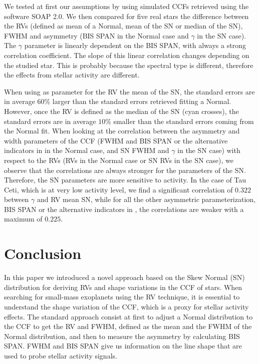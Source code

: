 \documentclass[11pt, oneside]{article}
\def\kms{\hbox{\,km\,s$^{-1}$}}       %
\begin{document}
{We tested at first our assumptions by using simulated CCFs retrieved using the software SOAP 2.0. We then compared for five real stars the difference between the RVs (defined as mean of a Normal, mean of the SN or median of the SN), FWHM and asymmetry (BIS SPAN in the Normal case and $\gamma$ in the SN case). The $\gamma$ parameter is linearly dependent on the BIS SPAN, with always a strong correlation coefficient. 
The slope of this linear correlation changes depending on the studied star. This is probably because the spectral type is different, therefore the effects from stellar activity are different.

When using as parameter for the RV the mean of the SN, the standard errors are in average $60\%$ larger than the standard errors retrieved fitting a Normal. However, once the RV is defined as the median of the SN (cyan crosses), the standard errors are in average $10\%$ smaller than the standard errors coming from the Normal fit. When looking at the correlation between the asymmetry and width parameters of the CCF (FWHM and BIS SPAN or the alternative indicators in \citet{Figueira-2013} in the Normal case, and SN FWHM and $\gamma$ in the SN case) with respect to the RVs (RVs in the Normal case or SN RVs in the SN case), we observe that the correlations are always stronger for the parameters of the SN. Therefore, the SN parameters are more sensitive to activity. In the case of Tau Ceti, which is at very low activity level, we find a significant correlation of $0.322$ between $\gamma$ and RV mean SN, while for all the other asymmetric parameterization, BIS SPAN or the alternative indicators in \citet{Figueira-2013}, the correlations are weaker with a maximum of 0.$225$.

\section{Conclusion} \label{sec:conclu}

In this paper we introduced a novel approach based on the Skew Normal (SN) distribution for deriving RVs and shape variations in the CCF of stars. When searching for small-mass exoplanets using the RV technique, it is essential to understand the shape variation of the CCF, which is a proxy for stellar activity effects. The standard approach consist at first to adjust a Normal distribution to the CCF to get the RV and FWHM, defined as the mean and the FWHM of the Normal distribution, and then to measure the asymmetry by calculating BIS SPAN. FWHM and BIS SPAN give us information on the line shape that are used to probe stellar activity signals. 

}
\end{document}
